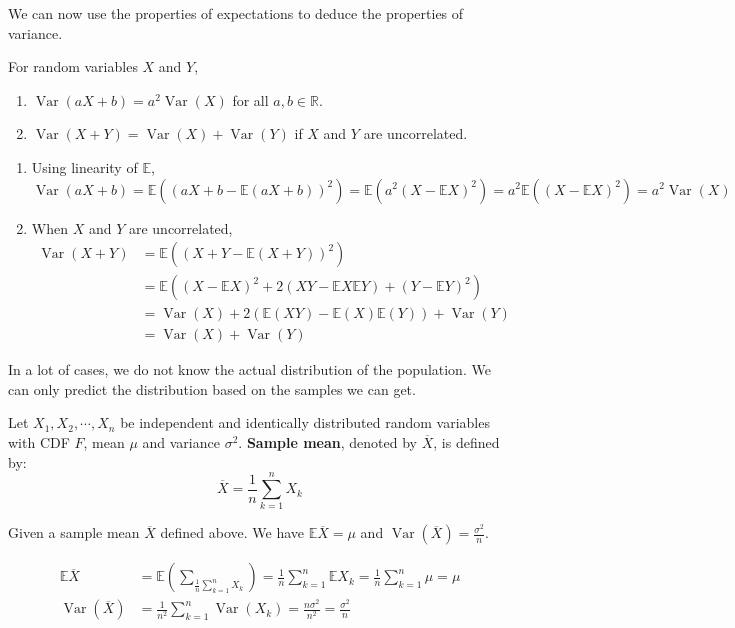 \documentclass{huhtakm-template-book}
\newcommand{\expect}{\mathbb{E}}
\DeclareMathOperator{\Var}{Var}
\begin{document}
We can now use the properties of expectations to deduce the properties of variance.
\begin{thm}
	For random variables $X$ and $Y$,
	\begin{enumerate}
		\item $\Var(aX+b)=a^{2}\Var(X)$ for all $a,b\in\mathbb{R}$.
		\item $\Var(X+Y)=\Var(X)+\Var(Y)$ if $X$ and $Y$ are uncorrelated.
	\end{enumerate}
\end{thm}
\begin{proofing}
	\begin{enumerate}
		\item Using linearity of $\expect$,
		\begin{equation*}
			\Var(aX+b)=\expect((aX+b-\expect(aX+b))^{2})=\expect(a^{2}(X-\expect X)^{2})=a^{2}\expect((X-\expect X)^{2})=a^{2}\Var(X)
		\end{equation*}
		\item When $X$ and $Y$ are uncorrelated,
		\begin{align*}
			\Var(X+Y)&=\expect((X+Y-\expect(X+Y))^{2})\\
			&=\expect((X-\expect X)^{2}+2(XY-\expect X\expect Y)+(Y-\expect Y)^{2})\\
			&=\Var(X)+2(\expect(XY)-\expect(X)\expect(Y))+\Var(Y)\\
			&=\Var(X)+\Var(Y)
		\end{align*}
	\end{enumerate}
\end{proofing}
In a lot of cases, we do not know the actual distribution of the population. We can only predict the distribution based on the samples we can get.
\begin{defn}
	Let $X_{1},X_{2},\cdots,X_{n}$ be independent and identically distributed random variables with CDF $F$, mean $\mu$ and variance $\sigma^{2}$. \textbf{Sample mean}, denoted by $\overline{X}$, is defined by:
	\begin{equation*}
		\overline{X}=\frac{1}{n}\sum_{k=1}^{n}X_{k}
	\end{equation*}
\end{defn}
\begin{thm}
	Given a sample mean $\overline{X}$ defined above. We have $\expect{\overline{X}}=\mu$ and $\Var(\overline{X})=\frac{\sigma^{2}}{n}$.
\end{thm}
\begin{proofing}
	\begin{align*}
		\expect{\overline{X}}&=\expect\left(\sum_{\frac{1}{n}\sum_{k=1}^{n}X_{k}}\right)=\frac{1}{n}\sum_{k=1}^{n}\expect{X_{k}}=\frac{1}{n}\sum_{k=1}^{n}\mu=\mu\\
		\Var(\overline{X})&=\frac{1}{n^{2}}\sum_{k=1}^{n}\Var(X_{k})=\frac{n\sigma^{2}}{n^{2}}=\frac{\sigma^{2}}{n}
	\end{align*}
\end{proofing}
\end{document}
